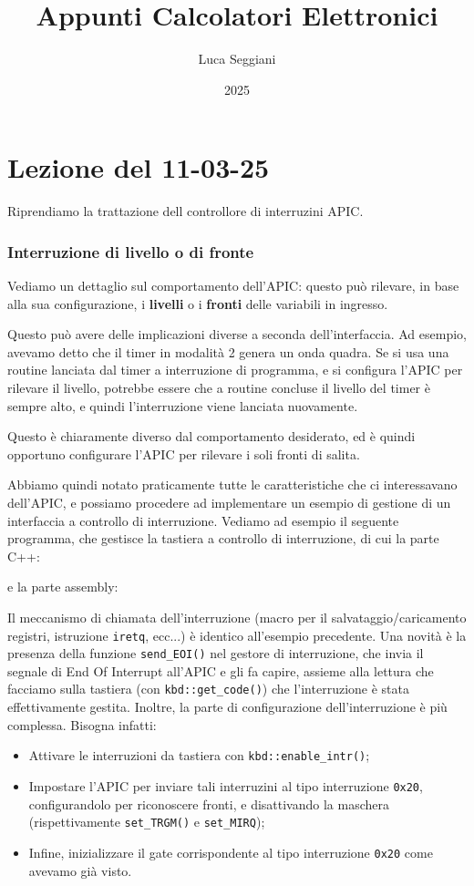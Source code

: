\documentclass[a4paper,11pt]{article}
\title{Appunti Calcolatori Elettronici}
\author{Luca Seggiani}
\date{2025}
\begin{document}
\section{Lezione del 11-03-25}

\thispagestyle{empty}
\pagestyle{fancy}

Riprendiamo la trattazione dell controllore di interruzini APIC.

\subsubsection{Interruzione di livello o di fronte}
Vediamo un dettaglio sul comportamento dell'APIC: questo può rilevare, in base alla sua configurazione, i \textbf{livelli} o i \textbf{fronti} delle variabili in ingresso.

Questo può avere delle implicazioni diverse a seconda dell'interfaccia.
Ad esempio, avevamo detto che il timer in modalità 2 genera un onda quadra.
Se si usa una routine lanciata dal timer a interruzione di programma, e si configura l'APIC per rilevare il livello, potrebbe essere che a routine concluse il livello del timer è sempre alto, e quindi l'interruzione viene lanciata nuovamente.

Questo è chiaramente diverso dal comportamento desiderato, ed è quindi opportuno configurare l'APIC per rilevare i soli fronti di salita.

\par\medskip

Abbiamo quindi notato praticamente tutte le caratteristiche che ci interessavano dell'APIC, e possiamo procedere ad implementare un esempio di gestione di un interfaccia a controllo di interruzione.
Vediamo ad esempio il seguente programma, che gestisce la tastiera a controllo di interruzione, di cui la parte C++:
\lstset{style=codestyle, language=C++}

e la parte assembly:
\lstset{style=codestyle, language=assembler}


Il meccanismo di chiamata dell'interruzione (macro per il salvataggio/caricamento registri, istruzione \lstinline|iretq|, ecc...) è identico all'esempio precedente.
Una novità è la presenza della funzione \lstinline|send_EOI()| nel gestore di interruzione, che invia il segnale di End Of Interrupt all'APIC e gli fa capire, assieme alla lettura che facciamo sulla tastiera (con \lstinline|kbd::get_code()|) che l'interruzione è stata effettivamente gestita.
Inoltre, la parte di configurazione dell'interruzione è più complessa.
Bisogna infatti:
\begin{itemize}
	\item Attivare le interruzioni da tastiera con \lstinline|kbd::enable_intr()|;
	\item Impostare l'APIC per inviare tali interruzini al tipo interruzione \lstinline|0x20|, configurandolo per riconoscere fronti, e disattivando la maschera (rispettivamente \lstinline|set_TRGM()| e \lstinline|set_MIRQ|);
	\item Infine, inizializzare il gate corrispondente al tipo interruzione \lstinline|0x20| come avevamo già visto.
\end{itemize}
\end{document}
